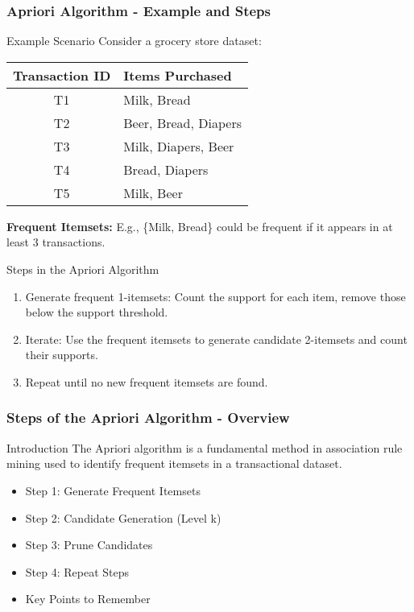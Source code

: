\documentclass[aspectratio=169]{beamer}
\begin{document}
\begin{frame}[fragile]
    \frametitle{Apriori Algorithm - Example and Steps}
    \begin{block}{Example Scenario}
        Consider a grocery store dataset:
        \begin{center}
            \begin{tabular}{|c|l|}
                \hline
                Transaction ID & Items Purchased \\
                \hline
                T1 & Milk, Bread \\
                T2 & Beer, Bread, Diapers \\
                T3 & Milk, Diapers, Beer \\
                T4 & Bread, Diapers \\
                T5 & Milk, Beer \\
                \hline
            \end{tabular}
        \end{center}
        \textbf{Frequent Itemsets:} E.g., \{Milk, Bread\} could be frequent if it appears in at least 3 transactions.
    \end{block}

    \begin{block}{Steps in the Apriori Algorithm}
        \begin{enumerate}
            \item Generate frequent 1-itemsets: Count the support for each item, remove those below the support threshold.
            \item Iterate: Use the frequent itemsets to generate candidate 2-itemsets and count their supports.
            \item Repeat until no new frequent itemsets are found.
        \end{enumerate}
    \end{block}
\end{frame}

\begin{frame}[fragile]
    \frametitle{Steps of the Apriori Algorithm - Overview}
    \begin{block}{Introduction}
        The Apriori algorithm is a fundamental method in association rule mining used to identify frequent itemsets in a transactional dataset.
    \end{block}
    \begin{itemize}
        \item Step 1: Generate Frequent Itemsets
        \item Step 2: Candidate Generation (Level k)
        \item Step 3: Prune Candidates
        \item Step 4: Repeat Steps
        \item Key Points to Remember
    \end{itemize}
\end{frame}
\end{document}
